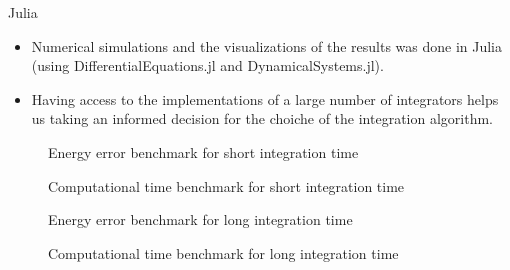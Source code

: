 \documentclass{beamer}
\begin{document}

\begin{frame}{Julia}
	\begin{itemize}
		\item Numerical simulations and the visualizations of the
		results was done in Julia (using
		DifferentialEquations.jl and DynamicalSystems.jl).
		\item Having access to the implementations of a large
		number of integrators helps us taking an informed decision
		for the choiche of the integration algorithm.
	\end{itemize}
\end{frame}


\begin{frame}
	\begin{figure}
		
		\caption{Energy error benchmark for short integration time}
	\end{figure}
\end{frame}


\begin{frame}
	\begin{figure}
		
		\caption{Computational time benchmark for short integration time}
	\end{figure}
\end{frame}


\begin{frame}
	\begin{figure}
		
		\caption{Energy error benchmark for long integration time}
	\end{figure}
\end{frame}


\begin{frame}
	\begin{figure}
		
		\caption{Computational time benchmark for long integration time}
	\end{figure}
\end{frame}
\end{document}
